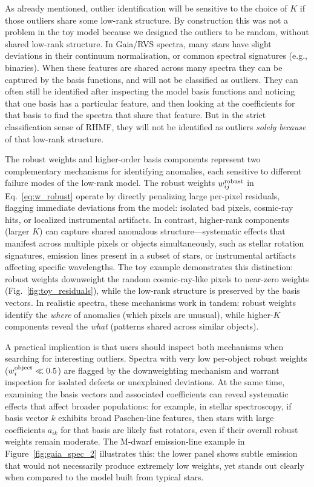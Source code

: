 \documentclass[onecolumn,floatfix,linenumbers,trackchanges]{aastex631}
\begin{document}
As already mentioned, outlier identification will be sensitive to the choice of $K$ if those outliers share some low-rank structure.
By construction this was not a problem in the toy model because we designed the outliers to be random, without shared low-rank structure.
In Gaia/RVS spectra, many stars have slight deviations in their continuum normalisation, or common spectral signatures (e.g., binaries). When these features are shared across many spectra they can be captured by the basis functions, and will not be classified as outliers. 
They can often still be identified after inspecting the model basis functions and noticing that one basis has a particular feature, and then looking at the coefficients for that basis to find the spectra that share that feature. But in the strict classification sense of RHMF, they will not be identified as outliers \emph{solely because} of that low-rank structure.


The robust weights and higher-order basis components represent two complementary mechanisms for identifying anomalies, each sensitive to different failure modes of the low-rank model.
The robust weights $w^{\rm robust}_{ij}$ in Eq.~\eqref{eq:w_robust} operate by directly penalizing large per-pixel residuals, flagging immediate deviations from the model: isolated bad pixels, cosmic-ray hits, or localized instrumental artifacts.
In contrast, higher-rank components (larger $K$) can capture shared anomalous structure---systematic effects that manifest across multiple pixels or objects simultaneously, such as stellar rotation signatures, emission lines present in a subset of stars, or instrumental artifacts affecting specific wavelengths.
The toy example demonstrates this distinction: robust weights downweight the random cosmic-ray-like pixels to near-zero weights (Fig.~\ref{fig:toy_residuals}), while the low-rank structure is preserved by the basis vectors. In realistic spectra, these mechanisms work in tandem: robust weights identify the \emph{where} of anomalies (which pixels are unusual), while higher-$K$ components reveal the \emph{what} (patterns shared across similar objects).

A practical implication is that users should inspect both mechanisms when searching for interesting outliers. Spectra with very low per-object robust weights ($w_i^{\rm object} \ll 0.5$) are flagged by the downweighting mechanism and warrant inspection for isolated defects or unexplained deviations. At the same time, examining the basis vectors and associated coefficients can reveal systematic effects that affect broader populations: for example, in stellar spectroscopy, if basis vector $k$ exhibits broad Paschen-line features, then stars with large coefficients $a_{ik}$ for that basis are likely fast rotators, even if their overall robust weights remain moderate. The M-dwarf emission-line example in Figure~\ref{fig:gaia_spec_2} illustrates this: the lower panel shows subtle emission that would not necessarily produce extremely low weights, yet stands out clearly when compared to the model built from typical stars.
\end{document}
